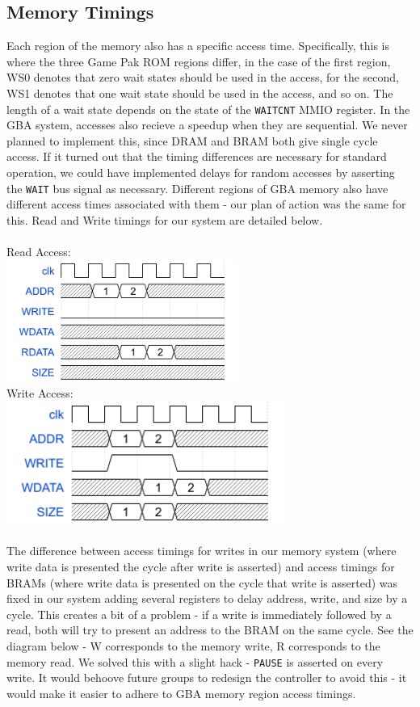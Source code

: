 \documentclass[11pt,a4paper]{article}
\begin{document}
	\subsection{Memory Timings}
	Each region of the memory also has a specific access time. Specifically, this is where the three Game Pak ROM regions differ, in the case of the first region, WS0 denotes that zero wait states should be used in the access, for the second, WS1 denotes that one wait state should be used in the access, and so on. The length of a wait state depends on the state of the \texttt{WAITCNT} MMIO register. In the GBA system, accesses also recieve a speedup when they are sequential. We never planned to implement this, since DRAM and BRAM both give single cycle access. If it turned out that the timing differences are necessary for standard operation, we could have implemented delays for random accesses by asserting the \texttt{WAIT} bus signal as necessary. Different regions of GBA memory also have different access times associated with them - our plan of action was the same for this. Read and Write timings for our system are detailed below.\\\\
	Read Access:\\
		\includegraphics[height=4cm, keepaspectratio=true]{readaccess}
		\\
	Write Access:\\
	\includegraphics[height=4cm, keepaspectratio=true]{writeaccess}
	\\\\
	The difference between access timings for writes in our memory system (where write data is presented the cycle after write is asserted) and access timings for BRAMs (where write data is presented on the cycle that write is asserted) was fixed in our system adding several registers to delay address, write, and size by a cycle. This creates a bit of a problem - if a write is immediately followed by a read, both will try to present an address to the BRAM on the same cycle. See the diagram below - W corresponds to the memory write, R corresponds to the memory read. We solved this with a slight hack - \texttt{PAUSE} is asserted on every write. It would behoove future groups to redesign the controller to avoid this - it would make it easier to adhere to GBA memory region access timings.
	
\end{document}
